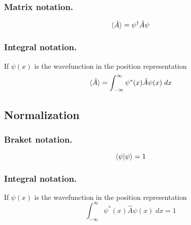 \documentclass[../../../main.tex]{subfiles}
\begin{document}
\subsubsection*{Matrix notation.}
\begin{equation*}
    \braket{\hat{A}}=\psi^{\dagger}\hat{A}\psi
\end{equation*}

\subsubsection*{Integral notation.} If $\psi(x)$ is the wavefunction in the position representation
\begin{equation*}
    \braket{\hat{A}}=\int_{-\infty}^{\infty}\psi^*(x)\hat{A}\psi(x)\;dx
\end{equation*}

\subsection*{Normalization}
\subsubsection*{Braket notation.}
\begin{equation*}
    \braket{\psi|\psi}=1
\end{equation*}

\subsubsection*{Integral notation.} If $\psi(x)$ is the wavefunction in the position representation
\begin{equation*}
    \int_{-\infty}^{\infty}\psi^*(x)\hat{A}\psi(x)\;dx=1
\end{equation*}
\end{document}
